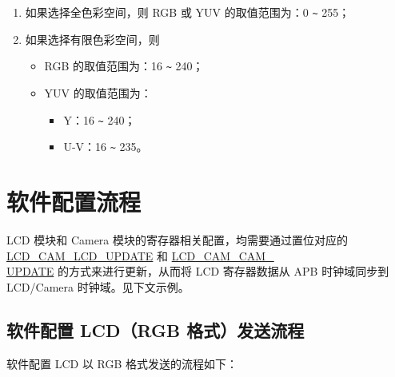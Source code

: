 \documentclass[main\_\_CN.tex]{subfiles}
\begin{document}
\begin{tiplisting}
\vspace{-2em}
\begin{enumerate}
    \item \label{full-color-range-note} 如果选择全色彩空间，则 RGB 或 YUV 的取值范围为：0 \verb+~+ 255；
    \item \label{limited-color-range-note} 如果选择有限色彩空间，则\begin{itemize}
        \item RGB 的取值范围为：16 \verb+~+ 240；
        \item YUV 的取值范围为：
        \begin{itemize}
            \item Y：16 \verb+~+ 240；
            \item U-V：16 \verb+~+ 235。
        \end{itemize}

    \end{itemize}

\end{enumerate}
\end{tiplisting}

\section{软件配置流程}
\begin{tiplisting}
LCD 模块和 Camera 模块的寄存器相关配置，均需要通过置位对应的 \hyperref[fielddesc:LCDCAMLCDUPDATE]{LCD\_CAM\_LCD\_UPDATE} 和 \hyperref[fielddesc:LCDCAMCAMUPDATE]{LCD\_CAM\_CAM\_\\UPDATE} 的方式来进行更新，从而将 LCD 寄存器数据从 APB 时钟域同步到 LCD/Camera 时钟域。见下文示例。
\end{tiplisting}
\vspace{-2em}
\subsection{软件配置 LCD（RGB 格式）发送流程}
软件配置 LCD 以 RGB 格式发送的流程如下：
\end{document}
